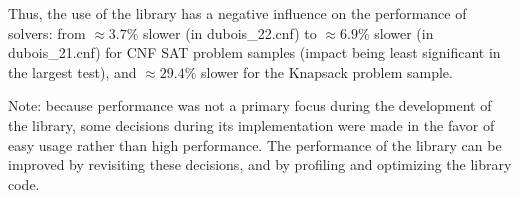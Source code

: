 Thus, the use of the library has a negative influence on the performance of solvers:
from $\approx 3.7\%$ slower (in dubois\_22.cnf) to $\approx 6.9\%$ slower (in dubois\_21.cnf)
for CNF SAT problem samples (impact being least significant in the largest test),
and $\approx 29.4\%$ slower for the Knapsack problem sample.

Note: because performance was not a primary focus during the development of the library,
some decisions during its implementation were made in the favor of easy usage rather than
high performance. The performance of the library can be improved by revisiting these
decisions, and by profiling and optimizing the library code.
